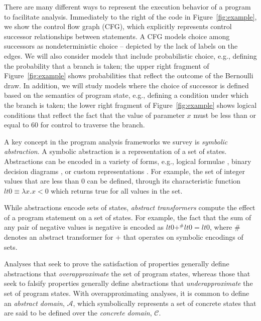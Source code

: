 There are many different ways to represent the execution behavior
of a program to facilitate analysis.  Immediately to the right of
the code in Figure~\ref{fig:example}, we show the control flow graph (CFG),
which explicitly represents control successor relationships between
statements.  A CFG models choice among successors as nondeterministic
choice -- depicted by the lack of labels on the edges.
We will also consider models that include probabilistic choice,
e.g., defining the probability that a branch is taken; the
upper right fragment of Figure~\ref{fig:example} shows probabilities
that reflect the outcome of the Bernoulli draw.
In addition, we will study models where the
choice of successor is defined based on the semantics
of program state, e.g., defining a condition under which the branch
is taken; the lower right fragment of Figure~\ref{fig:example}
shows logical conditions that 
reflect the fact that the value of parameter $x$ must be
less than or equal to $60$ for control to traverse the branch.

A key concept in the program analysis frameworks we survey is
\textit{symbolic abstraction}.  A symbolic abstraction is a 
representation of a set of states.  Abstractions can be encoded
in a variety of forms, e.g., logical formulae \cite{thakur2012bilateral}, binary
decision diagrams \cite{bryant1992symbolic}, or custom representations \cite{bagnara2008parma}.  For example, the set of integer values that
are less than $0$ can be defined, through its characteristic
function $lt0 \equiv \lambda x.x<0$ which returns true for all values in the set.

While abstractions encode sets of states, \textit{abstract transformers}
compute the effect of a program statement on a set of states.  For example,
the fact that the sum of any pair of negative values is negative is
encoded as $lt0 +^\# lt0 = lt0$, where $\#$ denotes an abstract transformer
for $+$ that operates on symbolic encodings of sets.

Analyses that seek to prove the satisfaction of properties generally
define abstractions that \textit{overapproximate} the set of program
states, whereas those that seek to falsify properties generally define
abstractions that \textit{underapproximate} the set of program states.
With overapproximating analyses, it is common to define an \textit{abstract
domain}, $\mathcal{A}$, 
which symbolically represents a set of concrete states that
are said to be defined over the \textit{concrete domain}, $\mathcal{C}$.


